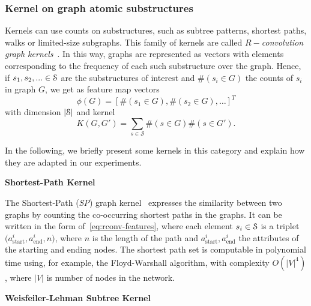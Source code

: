 \subsubsection{Kernel on graph atomic substructures}

Kernels can use counts on substructures, such as subtree patterns, shortest paths, walks or limited-size subgraphs.
This family of kernels are called \emph{$R-$convolution graph kernels}~\citep{haussler}.
In this way, graphs are represented as vectors with elements corresponding to the frequency of each such substructure over the graph.
Hence, if
$ s_1, s_2, ... \in \mathcal{S}$ are the substructures of interest and $ \#\left(s_i \in G\right)$ the counts of $ s_i $ in graph $ G $, we get as feature map vectors
\[ 
\phi(G) = \left[\#\left(s_1 \in G\right), \#\left(s_2 \in G\right), \dots\right]^T
\label{eq:rconv-features}
\]
with dimension $ |\mathcal{S}| $  and kernel
\[
K(G, G') = \sum_{s \in \mathcal{S}} \#\left(s \in G\right) \#\left(s \in G'\right).
\]

In the following, we briefly present some kernels in this category and explain how they are adapted in our experiments.

\vspace{1em}
\noindent\textbf{Shortest-Path Kernel}

The Shortest-Path (\emph{SP}) graph kernel~\citep{borgwardt2005} expresses the similarity between two graphs by counting the co-occurring shortest paths in the graphs.
It can be written in the form of~\cref{eq:rconv-features}, where each element $ s_i \in \mathcal{S} $ is a triplet $\big(a_{\text{start}}^i, a_{\text{end}}^i, n\big)$, where $ n $ is the length of the path and $ a_{\text{start}}^i, a_{\text{end}}^i $ the attributes of the starting and ending nodes.
The shortest path set is computable in polynomial time using, for example, the Floyd-Warshall algorithm, with complexity $ O(|V|^4)$, where $ |V| $ is number of nodes in the network.

\vspace{1em}
\noindent\textbf{Weisfeiler-Lehman Subtree Kernel}

